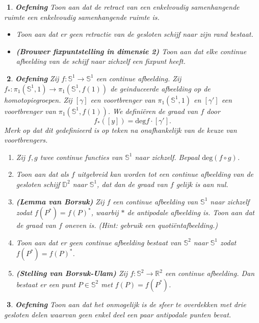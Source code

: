 \documentclass[12pt]{book}
\newcommand{\R}{\mathbb{R}}
\newtheorem{eoef}{$\!\!$}[chapter]
\newenvironment{oef}{\begin{eoef} {\bf Oefening}}{\end{eoef}}
\begin{document}
\begin{oef}
Toon aan dat de retract van een enkelvoudig samenhangende ruimte een enkelvoudig samenhangende ruimte is.
\item
\begin{itemize}
\item
Toon aan dat er geen retractie van de gesloten schijf naar zijn rand bestaat.
\item
\textbf{(Brouwer fixpuntstelling in dimensie 2)} Toon aan dat elke continue afbeelding van de schijf naar zichzelf een fixpunt heeft.
\end{itemize}

\end{oef}
\begin{oef}
Zij $f : \mathbb{S}^1 \rightarrow \mathbb{S}^1$ een continue afbeelding. Zij $f_* : \pi_1(\mathbb{S}^1,1) \rightarrow \pi_1(\mathbb{S}^1,f(1))$ de geinduceerde afbeelding op de homotopiegroepen. Zij $[\gamma]$ een voortbrenger van  $\pi_1(\mathbb{S}^1,1)$ en $[\gamma']$ een voortbrenger van $ \pi_1(\mathbb{S}^1,f(1))$. We defini\"eren de {\em graad} van $f$ door 
\[
f_*([y]) = \mathrm{deg} f \cdot [\gamma'] .
\] 
Merk op dat dit gedefinieerd is op teken na onafhankelijk van de keuze van voortbrengers.

\begin{enumerate}
\item
Zij $f,g$ twee continue functies van $\mathbb{S}^1$ naar zichzelf. Bepaal $\mathrm{deg} (f \circ g)$.
\item

Toon aan dat als $f$ uitgebreid kan worden tot een continue afbeelding van de gesloten schijf $\mathbb{D}^2$ naar $\mathbb{S}^1$, dat dan de graad van $f$ gelijk is aan nul. 
\item
\textbf{(Lemma van Borsuk)} Zij $f$ een continue afbeelding van $\mathbb{S}^1$ naar zichzelf zodat $f(P^*) =f(P)^*$, waarbij $*$ de antipodale afbeelding is. Toon aan dat de graad van $f$ oneven is. (Hint: gebruik een quoti\"entafbeelding.)
\item
Toon aan dat er geen continue afbeelding bestaat van $\mathbb{S}^2$ naar $\mathbb{S}^1$ zodat $f(P^*) =f(P)^*$.
\item \textbf{(Stelling van Borsuk-Ulam)} 
Zij $f: \mathbb{S}^2 \rightarrow \R^2$ een continue afbeelding. Dan bestaat er een punt $P \in \mathbb{S}^2$ met $f(P)= f(P^*)$.  


\end{enumerate}

\end{oef}
\begin{oef}
Toon aan dat het onmogelijk is de sfeer te overdekken met drie gesloten delen waarvan geen enkel deel een paar antipodale punten bevat.
\end{oef}
\end{document}
